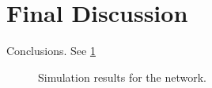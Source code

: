 \section{Final Discussion}
\label{sec:final_discussion}

Conclusions. See \cref{fig:the_graph}

\begin{figure}[!t]
    \centering
    
    \caption{Simulation results for the network.}
    \label{fig:the_graph}
\end{figure}
